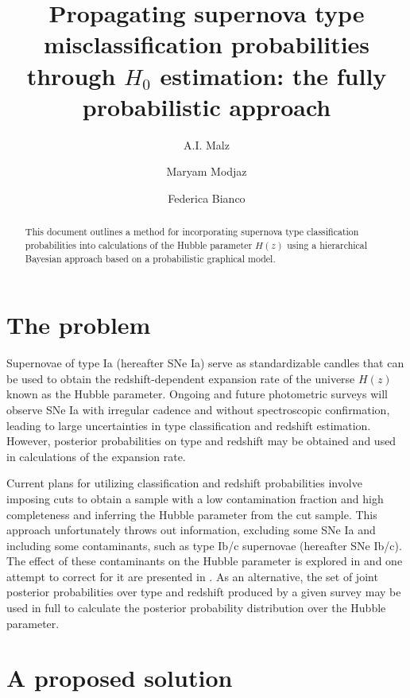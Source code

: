 \documentclass[12pt, onecolumn]{emulateapj}
\begin{document}
\title{Propagating supernova type misclassification probabilities through $H_{0}$ estimation: the fully probabilistic approach}

\author{A.I. Malz}
\author{Maryam Modjaz}
\author{Federica Bianco}

\begin{abstract}
This document outlines a method for incorporating supernova type classification probabilities into calculations of the Hubble parameter $H(z)$ using a hierarchical Bayesian approach based on a probabilistic graphical model.
\end{abstract}

\keywords{}

\section{The problem}
\label{sec:intro}

Supernovae of type Ia (hereafter SNe Ia) serve as standardizable candles that can be used to obtain the redshift-dependent expansion rate of the universe $H(z)$ known as the Hubble parameter.  Ongoing and future photometric surveys will observe SNe Ia with irregular cadence and without spectroscopic confirmation, leading to large uncertainties in type classification and redshift estimation.  However, posterior probabilities on type and redshift may be obtained and used in calculations of the expansion rate.  

Current plans for utilizing classification and redshift probabilities involve imposing cuts to obtain a sample with a low contamination fraction and high completeness and inferring the Hubble parameter from the cut sample.  This approach unfortunately throws out information, excluding some SNe Ia and including some contaminants, such as type Ib/c supernovae (hereafter SNe Ib/c).  The effect of these contaminants on the Hubble parameter is explored in \citet{Homeier05} and one attempt to correct for it are presented in \citet{Kessler16}.  As an alternative, the set of joint posterior probabilities over type and redshift produced by a given survey may be used in full to calculate the posterior probability distribution over the Hubble parameter.  

\section{A proposed solution}
\label{sec:confrac}
\end{document}
